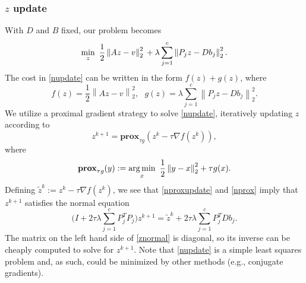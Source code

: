 \subsubsection{$z$ update}
With $D$ and $B$ fixed, our problem becomes
\begin{equation} \label{nupdate}
\min_{z} \ \frac{1}{2} \left \| A z - v \right \|_2^2 \\ +  \lambda \sum_{j = 1}^c \left \| P_j z - D b_j \right \|_2^2.
\end{equation}
The cost in \eqref{nupdate} can be written in the form $f(z)+g(z)$, where 
\begin{equation}
f(z) = \frac{1}{2} \left \| A z - v \right \|_2^2, \ \ \ g(z) = \lambda \sum_{j = 1}^c \left \| P_j z - D b_j \right \|_2^2.
\end{equation}
We utilize a proximal gradient \cite{parboyd} strategy to solve \eqref{nupdate}, iteratively updating $z$ according to
\begin{equation} \label{nproxupdate}
z^{k+1} = \textbf{prox}_{\tau g}(z^{k} - \tau \nabla f(z^{k})),
\end{equation}
where
\begin{equation} \label{nprox}
\textbf{prox}_{\tau g} (y) := \operatorname*{arg\,min}_{x} \ \frac{1}{2} \left \| y - x \right \|_2^2 +  \tau g(x).
\end{equation}
Defining $\tilde{z}^{k} := z^{k} - \tau \nabla f(z^{k})$, we see that \eqref{nproxupdate} and \eqref{nprox} imply that $z^{k+1}$ satisfies the normal equation
\begin{equation}\label{znormal}
\bigg(I + 2 \tau \lambda \sum_{j=1}^c P_j^T P_j \bigg) z^{k+1} = \tilde{z}^{k} + 2 \tau \lambda \sum_{j=1}^c P_j^T D b_j.
\end{equation}
The matrix on the left hand side of \eqref{znormal} is diagonal, so its inverse can be cheaply computed to solve for $z^{k+1}$. Note that \eqref{nupdate} is a simple least squares problem and, as such, could be minimized by other methods (e.g., conjugate gradients).
